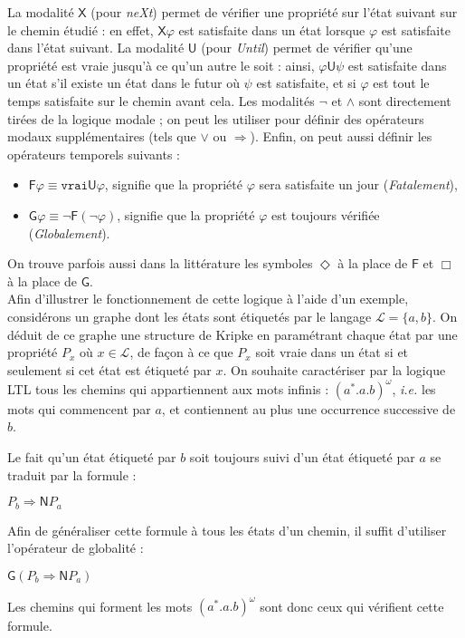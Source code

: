 La modalité $\mathsf{X}$ (pour \emph{neXt}) permet de vérifier une propriété sur l'état suivant sur le chemin étudié : en effet, $\mathsf{X} \varphi$ est satisfaite dans un état lorsque $\varphi$ est satisfaite dans l'état suivant. La modalité $\mathsf{U}$ (pour \emph{Until}) permet de vérifier qu'une propriété est vraie jusqu'à ce qu'un autre le soit : ainsi, $\varphi \mathsf{U} \psi$ est satisfaite dans un état s'il existe un état dans le futur où $\psi$ est satisfaite, et si $\varphi$ est tout le temps satisfaite sur le chemin avant cela. Les modalités $\neg$ et $\wedge$ sont directement tirées de la logique modale ; on peut les utiliser pour définir des opérateurs modaux supplémentaires (tels que $\vee$ ou $\Rightarrow$). Enfin, on peut aussi définir les opérateurs temporels suivants :
\begin{itemize}
  \item $\mathsf{F} \varphi \equiv \texttt{vrai} \mathsf{U} \varphi$, signifie que la propriété $\varphi$ sera satisfaite un jour (\textit{Fatalement}),
  \item $\mathsf{G} \varphi \equiv \neg \mathsf{F} (\neg \varphi)$, signifie que la propriété $\varphi$ est toujours vérifiée (\textit{Globalement}).
\end{itemize}
On trouve parfois aussi dans la littérature les symboles $\Diamond$ à la place de $\mathsf{F}$ et $\Box$ à la place de $\mathsf{G}$.\\

Afin d'illustrer le fonctionnement de cette logique à l'aide d'un exemple, considérons un graphe dont les états sont étiquetés par le langage $\mathcal{L} = \{a, b\}$. On déduit de ce graphe une structure de Kripke en paramétrant chaque état par une propriété $P_x$ où $x \in \mathcal{L}$, de façon à ce que $P_x$ soit vraie dans un état si et seulement si cet état est étiqueté par $x$. On souhaite caractériser par la logique LTL tous les chemins qui appartiennent aux mots infinis : $(a^*.a.b)^{\omega}$, \textit{i.e.} les mots qui commencent par $a$, et contiennent au plus une occurrence successive de $b$.

Le fait qu'un état étiqueté par $b$ soit toujours suivi d'un état étiqueté par $a$ se traduit par la formule :
\begin{listesanspuce}
  \item $P_b \Rightarrow \mathsf{N}P_a$
\end{listesanspuce}
Afin de généraliser cette formule à tous les états d'un chemin, il suffit d'utiliser l'opérateur de globalité :
\begin{listesanspuce}
  \item $\mathsf{G}(P_b \Rightarrow \mathsf{N}P_a)$
\end{listesanspuce}
Les chemins qui forment les mots $(a^*.a.b)^{\omega}$ sont donc ceux qui vérifient cette formule.

